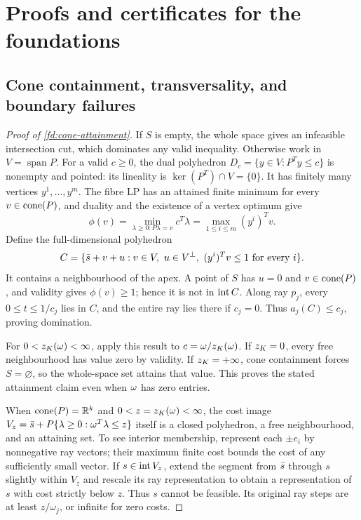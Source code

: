 \section{Proofs and certificates for the foundations}
\label{fd:appendix}

\subsection{Cone containment, transversality, and boundary failures}

\begin{proof}[Proof of \cref{fd:cone-attainment}]
\label{fd:cone-proof}
If $S$ is empty, the whole space gives an infeasible intersection cut,
which dominates any valid inequality. Otherwise work in
$V=\operatorname{span}P$. For a valid $c\ge0$, the dual polyhedron
$D_c=\{y\in V:P^Ty\le c\}$ is nonempty and pointed: its lineality is
$\ker(P^T)\cap V=\{0\}$. It has finitely many vertices
$y^1,\ldots,y^m$. The fibre LP has an attained finite minimum for every
$v\in\operatorname{cone}(P)$, and duality and the existence of a vertex optimum give
\[
 \phi(v)=\min_{\lambda\ge0:P\lambda=v}c^T\lambda
        =\max_{1\le i\le m}(y^i)^Tv.
\]
Define the full-dimensional polyhedron
\[
 C=\{\sbar+v+u:v\in V,\ u\in V^\perp,\ (y^i)^Tv\le1
       \text{ for every }i\}.
\]
It contains a neighbourhood of the apex. A point of $S$ has $u=0$ and
$v\in\operatorname{cone}(P)$, and validity gives $\phi(v)\ge1$; hence it is not in
$\operatorname{int} C$. Along ray $p_j$, every $0\le t\le1/c_j$ lies in $C$, and
the entire ray lies there if $c_j=0$. Thus $a_j(C)\le c_j$, proving
domination.

For $0<z_K(\omega)<\infty$, apply this result to $c=\omega/z_K(\omega)$.
If $z_K=0$, every free neighbourhood has value zero by validity.
If $z_K=+\infty$, cone containment forces $S=\varnothing$, so the
whole-space set attains that value. This proves the stated attainment
claim even when $\omega$ has zero entries.

When $\operatorname{cone}(P)=\mathbb R^k$ and $0<z=z_K(\omega)<\infty$, the cost image
$V_z=\bar s+P\{\lambda\ge0:\omega^T\lambda\le z\}$ itself is a closed
polyhedron, a free neighbourhood, and an attaining set.
To see interior membership, represent each $\pm e_i$ by nonnegative
ray vectors; their maximum finite cost bounds the cost of any
sufficiently small vector. If $s\in\operatorname{int} V_z$, extend the segment
from $\bar s$ through $s$ slightly within $V_z$ and rescale its
ray representation to obtain a representation of $s$ with cost
strictly below $z$. Thus $s$ cannot be feasible. Its original
ray steps are at least $z/\omega_j$, or infinite for zero costs.
\end{proof}

